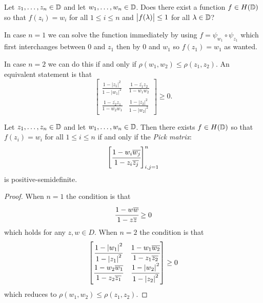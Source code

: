 \documentclass[11pt,a4paper]{article}
\begin{document}
\begin{problem}
  \label{problem:picks-interpolaltion-problem}
  Let $z_1,\dots,z_n \in \mathbb{D}$ and let
  $w_1,\dots,w_n \in \mathbb{D}$.
  Does there exist a function 
  $f \in H(\mathbb{D})$ so that
  $f(z_i) = w_i$ for all $1 \le i \le n$
  and $\left\lvert f(\lambda)\right\rvert \le 1$ for all $\lambda \in \mathbb{D}$?
\end{problem}
\begin{remark}
  In case $n = 1$ we can solve the function immediately by
  using $f = \psi_{w_1} \circ \psi_{z_1}$ which first interchanges between
  $0$ and $z_1$ then by $0$ and $w_1$ so $f(z_1) = w_1$ as wanted.
  
  In case $n = 2$ we can do this if and only if
  $\rho(w_1,w_2) \le \rho(z_1,z_2)$.
  An equivalent statement is that
  \[
    \begin{bmatrix}
      \frac {1-|z_{1}|^{2}}{1-|w_{1}|^{2}} &
      \frac {1-{\overline {z_{1}}}z_{2}}{1-{\overline {w_{1}}}w_{2}}
    \\[5pt]
      \frac {1-{\overline {z_{2}}}z_{1}}{1-{\overline {w_{2}}}w_{1}} &
      \frac {1-|z_{2}|^{2}}{1-|w_{2}|^{2}}
    \end{bmatrix}
    \geq 0.
  \]
\end{remark}

\begin{theorem}
  \label{thm:pick}
  Let $z_1,\dots,z_n \in \mathbb{D}$ and let
  $w_1,\dots,w_n \in \mathbb{D}$.
  Then there exists $f \in H(\mathbb{D})$ so that
  $f(z_i) = w_i$ for all $1 \le i \le n$ if and only if
  the \textit{Pick matrix}:
  \[
    \begin{bmatrix}
      \cfrac{1 - w_i \overline{w_j}}{1 - z_i \overline{z_j}}
    \end{bmatrix}_{i,j=1}^{n}
  \]
  is positive-semidefinite.
\end{theorem}
\begin{proof}
  When $n = 1$ the condition is that
  \[
    \cfrac{1 - w \overline{w}}{1 - z \overline{z}} \geq 0
  \]
  which holds for any $z,w \in D$.
  When $n = 2$ the condition is that
  \[
    \begin{bmatrix}
      \cfrac{1 - \left\lvert w_1\right\rvert^2}{1 - \left\lvert z_1\right\rvert^2} &
      \cfrac{1 - w_1 \overline{w_2}}{1 - z_1 \overline{z_2}}
      \\
      \cfrac{1 - w_2 \overline{w_1}}{1 - z_2 \overline{z_1}} &
      \cfrac{1 - \left\lvert w_2\right\rvert^2}{1 - \left\lvert z_2\right\rvert^2}
    \end{bmatrix} \geq 0
  \]
  which reduces to
  $\rho(w_1,w_2) \le \rho(z_1,z_2)$.
\end{proof}
\end{document}
